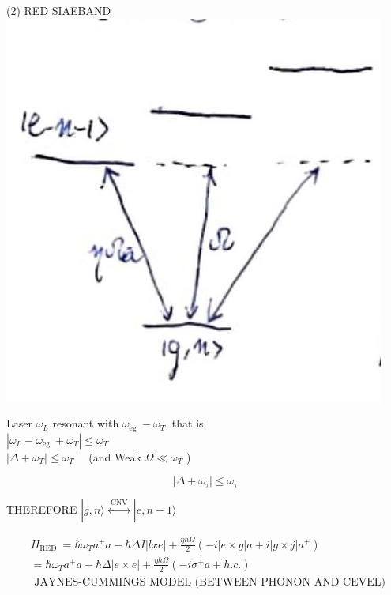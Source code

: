 \documentclass[10pt]{article}
\begin{document}
(2) RED SIAEBAND\\
\includegraphics[max width=\textwidth, center]{2025_10_16_9146de9f5ba4f09535e7g-5(2)}

Laser $\omega_{L}$ resonant with $\omega_{\text {eg }}-\omega_{T}$, that is\\
$\left|\omega_{L}-\omega_{\text {eg }}+\omega_{T}\right| \leqslant \omega_{T}$\\
$\left|\Delta+\omega_{T}\right| \leqslant \omega_{T} \quad$ (and Weak $\Omega \ll \omega_{T}$ )

$$
\left|\Delta+\omega_{\tau}\right| \leqslant \omega_{\tau}
$$

THEREFORE $|g, n\rangle \stackrel{\text { CNV }}{\longleftrightarrow}|e, n-1\rangle$

$$
\begin{aligned}
& H_{\text {RED }}=\hbar \omega_{T} a^{+} a-\hbar \Delta I|l x e|+\frac{\eta \hbar \Omega}{2}\left(-i|e \times g| a+i|g \times j| a^{+}\right) \\
& =\hbar \omega_{T} a^{+} a-\hbar \Delta|e \times e|+\frac{\eta \hbar \Omega}{2}\left(-i \sigma^{+} a+h . c .\right) \\
& \text { JAYNES-CUMMINGS MODEL (BETWEEN PHONON AND CEVEL) }
\end{aligned}
$$
\end{document}
